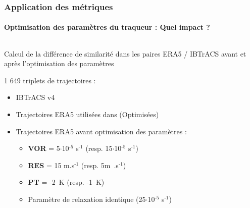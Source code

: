\documentclass[aspectratio=169, usepdftitle=false, xcolor={dvipsnames}, 9pt,table]{beamer}
\begin{document}
 \begin{frame}[c]
     \frametitle{Application des métriques}
     \framesubtitle{Optimisation des paramètres du traqueur : Quel impact ?}
     \begin{columns}
         \begin{column}{0.6\textwidth}
            \footnotesize
            \begin{definition}
                \centering
                Calcul de la différence de similarité dans les paires ERA5 / IBTrACS avant et après l'optimisation des paramètres
            \end{definition}
            \vspace{1em}
            \begin{block}
                1 649 \alert{triplets} de trajectoires :
                \begin{itemize}
                     \item IBTrACS v4
                     \item Trajectoires ERA5 utilisées dans \cite{dulac_assessing_2023} (Optimisées)
                     \item Trajectoires ERA5 \alert{avant} optimisation des paramètres :
                         \begin{itemize}
                             \footnotesize
                             \item \textbf{VOR} = 5$\cdot$10$^{\text{-5}}$ s$^{\text{-1}}$ (resp. 15$\cdot$10$^{\text{-5}}$ s$^{\text{-1}}$)
                             \item \textbf{RES} = 15 m.s$^{\text{-1}}$ (resp. 5m~.s$^{\text{-1}}$)
                             \item \textbf{PT} = -2~K (resp. -1~K)
                             \item Paramètre de relaxation \alert{identique} (25$\cdot$10$^{\text{-5}}$ s$^{\text{-1}}$)

\end{itemize}
\end{itemize}
\end{block}
\end{column}
\end{columns}
\end{frame}
\end{document}
